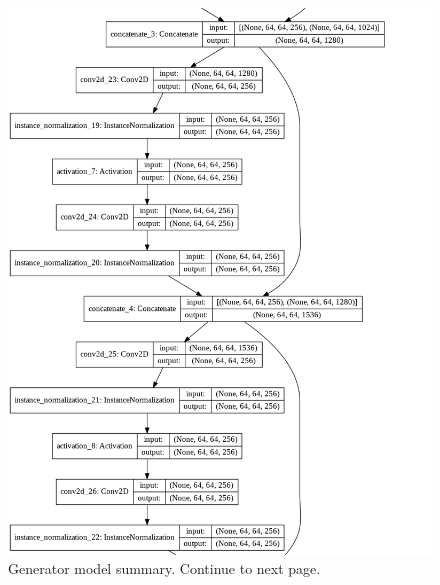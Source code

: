 \begin{figure}[H]
        \vspace*{3cm}
	    \begin{center} 
	    \includegraphics[scale=0.40]{images/Appendix/generator_4.png}
	    \caption{Generator model summary. Continue to next page.}
	    \end{center}
\end{figure}


